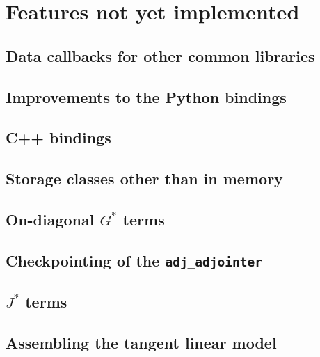 \chapter{Features not yet implemented} \label{chap:todo}
\section{Data callbacks for other common libraries}
\section{Improvements to the Python bindings}
\section{C++ bindings}
\section{Storage classes other than in memory}
\section{On-diagonal $G^*$ terms}
\section{Checkpointing of the \texttt{adj_adjointer}}
\section{$J^*$ terms}
\section{Assembling the tangent linear model}
